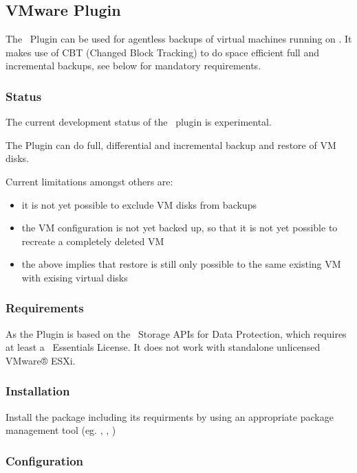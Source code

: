 \subsection{VMware Plugin}
\label{VMwarePlugin}

The \vmware\ Plugin can be
used for agentless backups of virtual machines running on
\vSphere.
It makes use of CBT (Changed Block Tracking) to do space efficient
full and incremental backups, see below for mandatory requirements.

\subsubsection{Status}

The current development status of the \vmware\
plugin is experimental.

The Plugin can do full, differential and incremental backup and restore of VM disks.

Current limitations amongst others are:
\begin{itemize}
\item it is not yet possible to exclude VM disks from backups
\item the VM configuration is not yet backed up, so that it is not yet
  possible to recreate a completely deleted VM
\item the above implies that restore is still only possible to the same existing
  VM with exising virtual disks
\end{itemize}

\subsubsection{Requirements}
As the Plugin is based on the \vSphere\ Storage APIs for Data Protection,
which requires at least a \vSphere\ Essentials License.
It does not work with standalone unlicensed
VMware® ESXi\trademark.

\subsubsection{Installation}

Install the package  including its requirments
by using an appropriate package management tool
(eg. , , )

\subsubsection{Configuration}

